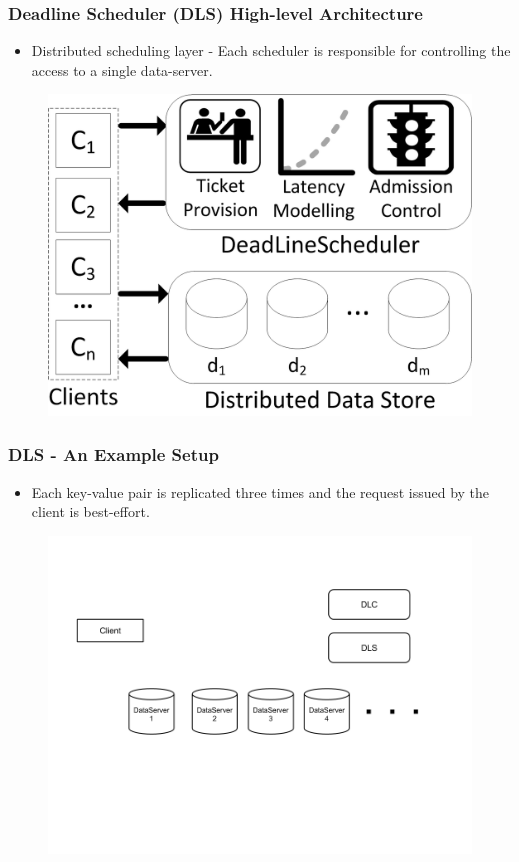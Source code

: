\documentclass{beamer}
\begin{document}
\begin{frame}
  \frametitle{Deadline Scheduler (DLS) High-level Architecture}
  \begin{itemize}
  \item Distributed scheduling layer - Each scheduler is responsible for
    controlling the access to a single data-server.
  \end{itemize}
  \begin{figure}
    \begin{center}
      \centerline{\includegraphics[scale=0.90]{img/DLS.png}}
    \end{center}
  \end{figure}
\end{frame}

\begin{frame}
  \frametitle{DLS - An Example Setup}
  \begin{itemize}
  \item Each key-value pair is replicated three times and the request issued
    by the client is best-effort.
  \end{itemize}
  \begin{figure}
    \begin{center}
      \centerline{\includegraphics[scale=0.40]{img/DLS_Example1.png}}
    \end{center}
  \end{figure}
\end{frame}
\end{document}
